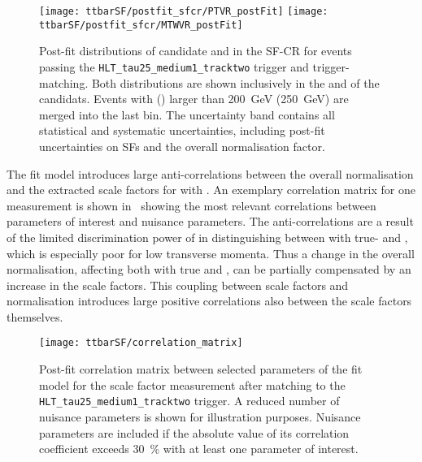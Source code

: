 \begin{figure}[htbp]
  \centering

  \texttt{[image: ttbarSF/postfit\_sfcr/PTVR\_postFit]}
  \texttt{[image: ttbarSF/postfit\_sfcr/MTWVR\_postFit]}

  \caption{Post-fit distributions of \tauhadvis candidate \pT and \mTW in the
    SF-CR for events passing the \texttt{HLT\_tau25\_medium1\_tracktwo} trigger
    and trigger-matching. Both distributions are shown inclusively in the
    \Ntracks and \pT of the \tauhadvis candidats. Events with \tauhadvis \pT
    (\mTW) larger than \SI{200}{\GeV} (\SI{250}{\GeV}) are merged into the last
    bin. The uncertainty band contains all statistical and systematic
    uncertainties, including post-fit uncertainties on \faketauhadvis SFs and
    the overall \ttbar normalisation factor.}%
  \label{fig:ttbarSF_postfit_ptmtw}
\end{figure}

The fit model introduces large anti-correlations between the overall
\ttbar normalisation and the extracted scale factors for \ttbar with
\faketauhadvis. An exemplary correlation matrix for one measurement is
shown in~ showing the most relevant
correlations between parameters of interest and nuisance parameters.
The anti-correlations are a result of the limited discrimination power
of \mTW in distinguishing between \ttbar with true- and
\faketauhadvis, which is especially poor for low \tauhadvis transverse
momenta. Thus a change in the overall \ttbar normalisation, affecting
both \ttbar with true and \faketauhadvis, can be partially compensated
by an increase in the \faketauhadvis scale factors. This coupling
between \faketauhadvis scale factors and \ttbar normalisation
introduces large positive correlations also between the scale factors
themselves.

\begin{figure}[htbp]
  \centering

  \texttt{[image: ttbarSF/correlation\_matrix]}

  \caption{Post-fit correlation matrix between selected parameters of
    the fit model for the \faketauhadvis scale factor measurement
    after matching \tauhadvis to the
    \texttt{HLT\_tau25\_medium1\_tracktwo} trigger. A reduced number
    of nuisance parameters is shown for illustration
    purposes. Nuisance parameters are included if the absolute value
    of its correlation coefficient exceeds \SI{30}{\percent} with at
    least one parameter of interest.}%
  \label{fig:ttbarSF_corr_matrix}
\end{figure}

